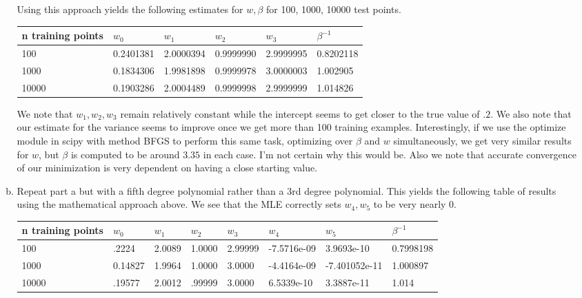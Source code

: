 \documentclass[12pt]{article}
\begin{document}
\begin{enumerate}
\begin{enumerate}[(a)]
		Using this approach yields the following estimates for $w, \beta$ for 100, 1000, 10000 test points. 
		\begin{table}[htb]
			\begin{tabular}{|l|l|l|l|l|l|}
				\hline
				n training points & $w_0$     & $w_1$     & $w_2$     & $w_3$     & $\beta^{-1}$   \\ \hline
				100               & 0.2401381 & 2.0000394 & 0.9999990 & 2.9999995 & 0.8202118 \\ \hline
				1000              & 0.1834306 & 1.9981898 & 0.9999978 & 3.0000003 & 1.002905  \\ \hline
				10000             & 0.1903286 & 2.0004489 & 0.9999998 & 2.9999999 & 1.014826  \\ \hline
			\end{tabular}
		\end{table}
		We note that $w_1, w_2, w_3$ remain relatively constant while the intercept seems to get closer to the true value of $.2$. We also note that our estimate for the variance seems to improve once we get more than 100 training examples. 
		Interestingly, if we use the optimize module in scipy with method BFGS to perform this same task, optimizing over $\beta$ and $w$ simultaneously, we get very similar results for $w$, but $\beta$ is computed to be around $3.35$ in each case. I'm not certain why this would be. Also we note that accurate convergence of our minimization is very dependent on having a close starting value. 
		
		\item Repeat part a but with a fifth degree polynomial rather than a 3rd degree polynomial. This yields the following table of results using the mathematical approach above. We see that the MLE correctly sets $w_4, w_5$ to be very nearly 0. 
		
		
		\begin{table}[htb]
			\begin{tabular}{|l|l|l|l|l|l|l|l|}
				\hline
				n training points & $w_0$     & $w_1$    & $w_2$    & $w_3$     & $w_4$         & $w_5$         & $\beta^{-1}$ \\ \hline
				100               & .2224     & 2.0089   & 1.0000 & 2.99999 & -7.5716e-09 & 3.9693e-10  & 0.7998198  \\ \hline
				1000              & 0.14827 & 1.9964& 1.0000 & 3.0000 & -4.4164e-09 & -7.401052e-11 & 1.000897   \\ \hline
				10000             & .19577  & 2.0012 & .99999 & 3.0000  & 6.5339e-10  & 3.3887e-11  & 1.014  \\ \hline
			\end{tabular}
		\end{table}
		

\end{enumerate}
\end{enumerate}
\end{document}
